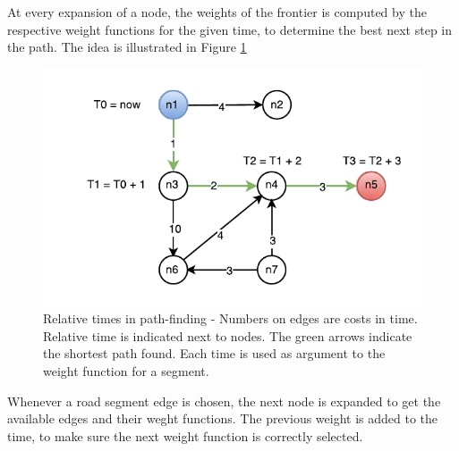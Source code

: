 At every expansion of a node, the weights of the frontier is computed by the respective weight functions for the given time, to determine the best next step in the path. The idea is illustrated in Figure \ref{fig:timed-graph} 
\begin{figure}[h]
\centering
\includegraphics[width=\linewidth]{figures/timed-graph}
\caption{Relative times in path-finding - Numbers on edges are costs in time. Relative time is indicated next to nodes. The green arrows indicate the shortest path found. Each time is used as argument to the weight function for a segment.}
\label{fig:timed-graph}
\end{figure}

Whenever a road segment edge is chosen, the next node is expanded to get the available edges and their weght functions. The previous weight is added to the time, to make sure the next weight function is correctly selected. 




